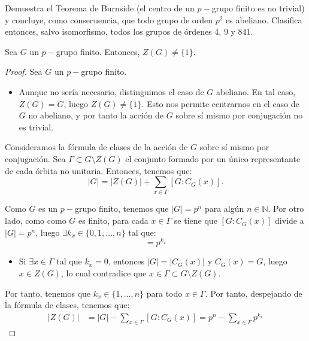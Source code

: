\newpage
\begin{ejercicio}
    Demuestra el Teorema de Burnside (el centro de un \(p-\)grupo finito es no trivial) y concluye, como consecuencia, que todo grupo de orden \(p^2\) es abeliano. Clasifica entonces, salvo isomorfismo, todos los grupos de órdenes \(4\), \(9\) y \(841\).
    \begin{teo}[de Burnside]
        Sea \(G\) un \(p-\)grupo finito. Entonces, $Z(G)\neq \{1\}$.
        \begin{proof}
            Sea \(G\) un \(p-\)grupo finito.
            \begin{itemize}
                \item Aunque no sería necesario, distinguimos el caso de $G$ abeliano. En tal caso, \(Z(G) = G\), luego \(Z(G)\neq \{1\}\). Esto nos permite centrarnos en el caso de \(G\) no abeliano, y por tanto la acción de \(G\) sobre sí mismo por conjugación no es trivial.
            \end{itemize}

            Consideramos la fórmula de clases de la acción de \(G\) sobre sí mismo por conjugación. Sea $\Gamma\subset G\setminus Z(G)$ el conjunto formado por un único representante de cada órbita no unitaria. Entonces, tenemos que:
            \begin{equation*}
                |G| = |Z(G)| + \sum_{x\in \Gamma} [G: C_G(x)].
            \end{equation*}

            Como \(G\) es un \(p-\)grupo finito, tenemos que \(|G| = p^n\) para algún \(n\in \mathbb{N}\). Por otro lado, como como $G$ es finito, para cada $x\in \Gamma$ se tiene que $[G: C_G(x)]$ divide a $|G|=p^n$, luego $\exists k_x\in \{0,1,\dots,n\}$ tal que:
            \begin{equation*}
                [G: C_G(x)] = p^{k_x}
            \end{equation*}

            \begin{itemize}
                \item Si $\exists x\in \Gamma$ tal que \(k_x = 0\), entonces $|G|=|C_G(x)|$ y \(C_G(x) = G\), luego \(x\in Z(G)\), lo cual contradice que \(x\in \Gamma\subset G\setminus Z(G)\).
            \end{itemize} 

            Por tanto, tenemos que \(k_x\in \{1, \ldots, n\}\) para todo \(x\in \Gamma\). Por tanto, despejando de la fórmula de clases, tenemos que:
            \begin{align*}
                |Z(G)| &= |G| - \sum_{x\in \Gamma} [G: C_G(x)]
                = p^n - \sum_{x\in \Gamma} p^{k_x}
            \end{align*}


\end{proof}
\end{teo}
\end{ejercicio}

